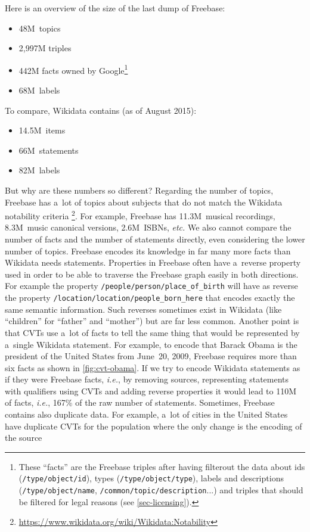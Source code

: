\documentclass{sig-alternate}
\begin{document}
Here is an overview of the size of the last dump of Freebase:

\begin{itemize}
  \setlength\itemsep{0em}
  \item 48M~topics
  \item 2,997M triples
  \item 442M facts owned by Google\footnote{These ``facts'' are the Freebase triples
      after having filterout the data about ids (\texttt{/type/object/id}),
      types (\texttt{/type/object/type}), labels and descriptions (\texttt{/type/object/name},
      \texttt{/common/topic/description}...) and triples that should be filtered
      for legal reasons (see \autoref{sec-licensing}).}
  \item 68M~labels
\end{itemize}

To compare, Wikidata contains (as of August 2015):

\begin{itemize}
    \setlength\itemsep{0em}
    \item 14.5M~items
    \item 66M~statements
    \item 82M~labels
\end{itemize}

But why are these numbers so different?
Regarding the number of topics, Freebase has a~lot of topics about subjects
that do not match the Wikidata notability criteria%
\footnote{\url{https://www.wikidata.org/wiki/Wikidata:Notability}}.
For example, Freebase has 11.3M~musical recordings, 8.3M~music canonical versions,
2.6M~ISBNs, \emph{etc.}
We also cannot compare the number of facts and the number of statements directly,
even considering the lower number of topics.
Freebase encodes its knowledge in far many more facts than Wikidata needs statements.
Properties in Freebase often have a~reverse property used in order to be able
to traverse the Freebase graph easily in both directions.
For example the property \texttt{/people/person/place\_of\_birth} will have as reverse
the property \texttt{/location/location/people\_born\_here} that encodes
exactly the same semantic information.
Such reverses sometimes exist in Wikidata (like ``children'' for ``father'' and ``mother'')
but are far less common.
Another point is that CVTs use a~lot of facts to tell the same thing that
would be represented by a~single Wikidata statement.
For example, to encode that Barack Obama is the president of the United States from June~20, 2009,
Freebase requires more than six facts as shown in \autoref{fig:cvt-obama}.
If we try to encode Wikidata statements as if they were Freebase facts, \emph{i.e.},
by removing sources, representing statements with qualifiers using CVTs
and adding reverse properties it would lead to 110M of facts,
\emph{i.e.}, 167\% of the raw number of statements.
Sometimes, Freebase contains also duplicate data.
For example, a~lot of cities in the United States have duplicate CVTs for the population
where the only change is the encoding of the source
\end{document}

